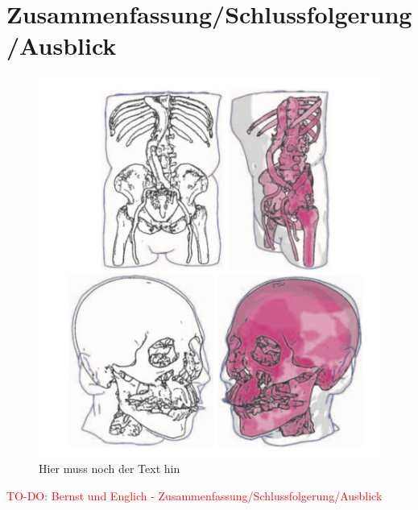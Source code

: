 \documentclass{paperStyle}
\newcommand\todo[1]{\textcolor{red}{#1}}
\begin{document}
\section{Zusammenfassung/Schlussfolgerung/Ausblick}
\begin{figure}
	\centering
		\includegraphics[width=0.9\linewidth]{ausblpel.png}
	\caption{Hier muss noch der Text hin}
\end{figure}
\todo{TO-DO: Bernst und Englich - Zusammenfassung/Schlussfolgerung/Ausblick}




\end{document}
